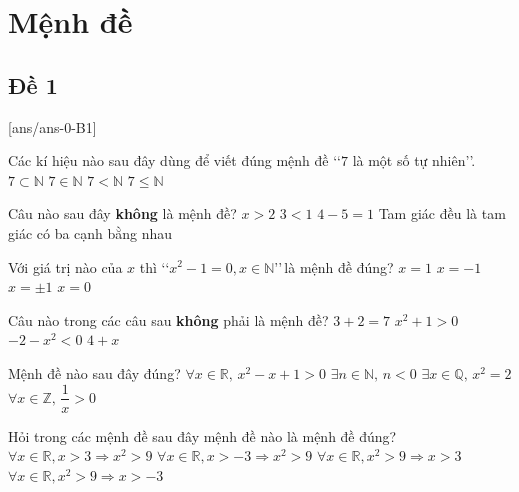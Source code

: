 \section{Mệnh đề}

\subsection{Đề 1}
 [ans/ans-0-B1]
 \caulc
 \begin{ex}%
 	Các kí hiệu nào sau đây dùng để viết đúng mệnh đề \lq\lq $7$ là một số tự nhiên\rq\rq.
 	\choice
 	{$7\subset \mathbb{N}$}
 	{\True $7\in \mathbb{N}$}
 	{$7 < \mathbb{N}$}
 	{$7 \leq \mathbb{N}$}
 \end{ex}
 \begin{ex}%
 	Câu nào sau đây \textbf{không} là mệnh đề?
 	\choice
 	{\True $x > 2$}
 	{$3 < 1$}
 	{$4 - 5 = 1$}
 	{Tam giác đều là tam giác có ba cạnh bằng nhau}
 \end{ex}	
 \begin{ex}%
 	Với giá trị nào của $x$ thì \lq\lq $x^2-1 = 0, x \in \mathbb{N}$\rq\rq \,là mệnh đề đúng?
 	\choice
 	{\True $x = 1$}
 	{$x = -1$}
 	{$x =\pm 1$}
 	{$x = 0$}
 \end{ex}
 \begin{ex}%
 	Câu nào trong các câu sau \textbf{không} phải là mệnh đề?
 	\choice
 	{$3+2=7$}
 	{$x^2+1 > 0$}
 	{$-2-x^2< 0$}
 	{\True $4+x$}
 \end{ex}
 \begin{ex}%
 	Mệnh đề nào sau đây đúng?
 	\choice
 	{\True $\forall x\in \mathbb{R},\,x^2-x+1 > 0$}
 	{$\exists n\in \mathbb{N},\,n < 0$}
 	{$\exists x\in \mathbb{Q},\, x^2=2$}
 	{$\forall x\in \mathbb{Z},\,\dfrac{1}{x}> 0$}
 \end{ex}
 
 \begin{ex}%
 	Hỏi trong các mệnh đề sau đây mệnh đề nào là mệnh đề đúng?
 	\choice
 	{\True $\forall x \in \mathbb{R}, x>3 \Rightarrow x^2>9$}
 	{$\forall x \in \mathbb{R}, x>-3 \Rightarrow x^2>9$}
 	{$\forall x \in \mathbb{R}, x^2>9 \Rightarrow x>3$}
 	{$\forall x \in \mathbb{R}, x^2>9 \Rightarrow x>-3$}
 \end{ex}
 
